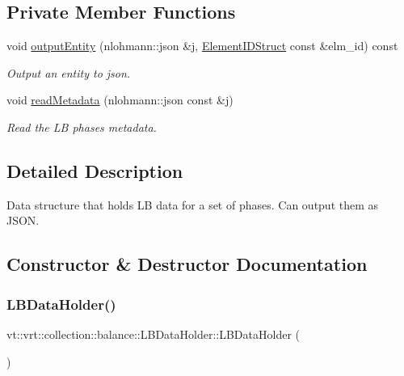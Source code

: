 \subsection*{Private Member Functions}
\begin{DoxyCompactItemize}
\item 
void \hyperlink{structvt_1_1vrt_1_1collection_1_1balance_1_1_l_b_data_holder_a6671c7581a2547eec99e096f956efeb2}{output\+Entity} (nlohmann\+::json \&j, \hyperlink{namespacevt_1_1vrt_1_1collection_1_1balance_a9f5b53fafb270212279a4757d2c4cd28}{Element\+I\+D\+Struct} const \&elm\+\_\+id) const
\begin{DoxyCompactList}\small\item\em Output an entity to json. \end{DoxyCompactList}\item 
void \hyperlink{structvt_1_1vrt_1_1collection_1_1balance_1_1_l_b_data_holder_a5cd0145d09eb1b0a1bdf6b5b6853267d}{read\+Metadata} (nlohmann\+::json const \&j)
\begin{DoxyCompactList}\small\item\em Read the LB phase\textquotesingle{}s metadata. \end{DoxyCompactList}\end{DoxyCompactItemize}


\subsection{Detailed Description}
Data structure that holds LB data for a set of phases. Can output them as J\+S\+ON. 

\subsection{Constructor \& Destructor Documentation}
\mbox{\label{structvt_1_1vrt_1_1collection_1_1balance_1_1_l_b_data_holder_aa1785b744e5b844588f9e8038aa2ef1e}} 
\subsubsection{\texorpdfstring{L\+B\+Data\+Holder()}{LBDataHolder()}\hspace{0.1cm}{\footnotesize\ttfamily [1/2]}}
{\footnotesize\ttfamily vt\+::vrt\+::collection\+::balance\+::\+L\+B\+Data\+Holder\+::\+L\+B\+Data\+Holder (\begin{DoxyParamCaption}{ }\end{DoxyParamCaption})\hspace{0.3cm}{\ttfamily [default]}}

